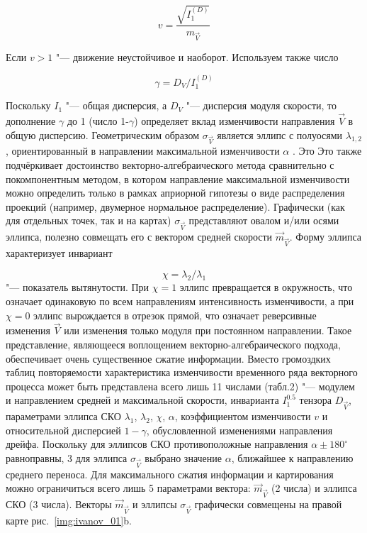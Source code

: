 \begin{equation}
\label{eq:equation3_11}
v=\frac{\sqrt{I^{(D)}_1}}{m_{\vec{V}}}
\end{equation} 

Если $v>1$ "--- движение неустойчивое и наоборот. Используем также число
		
\begin{equation}
\label{eq:equation3_12}
\gamma={D_{V}}/{I^{(D)}_1}
\end{equation} 
		
Поскольку $I_1$ "--- общая дисперсия, а $D_V$ "--- дисперсия модуля скорости, то дополнение $\gamma$ до 1 (число 1-$\gamma$) определяет вклад изменчивости направления $\vec{V}$ в общую дисперсию.
Геометрическим образом $\sigma_{\vec{V}}$ является эллипс с полуосями $\lambda_{1,2}$ , ориентированный в направлении максимальной изменчивости $\alpha$ . Это Это также подчёркивает достоинство векторно-алгебраического метода сравнительно с покомпонентным методом, в котором направление максимальной изменчивости можно определить только в рамках априорной гипотезы о виде распределения проекций (например, двумерное нормальное распределение). Графически (как для отдельных точек, так и на картах) $\sigma_{\vec{V}}$ представляют овалом и/или осями эллипса, полезно совмещать его с вектором средней скорости $\vec{m}_{\vec{V}}$. Форму эллипса характеризует инвариант
	
\begin{equation}
\label{eq:equation3_13}
\chi=\lambda_{2}/\lambda_{1}
\end{equation} "--- показатель вытянутости. При $\chi=1$ эллипс превращается в окружность, что означает одинаковую по всем направлениям интенсивность изменчивости, а при $\chi=0$ эллипс вырождается в отрезок прямой, что означает реверсивные изменения $\vec{V}$ или изменения только модуля при постоянном направлении.
Такое представление, являющееся воплощением векторно-алгебраического подхода, обеспечивает очень существенное сжатие информации. Вместо громоздких таблиц повторяемости характеристика изменчивости временного ряда векторного процесса может быть представлена всего лишь 11 числами (табл.2) "--- модулем и направлением средней и максимальной скорости, инварианта $I^{0.5}_1$ тензора $D_{\vec{V}}$, параметрами эллипса СКО $\lambda_1$, $\lambda_2$, $\chi$, $\alpha$, коэффициентом изменчивости $v$ и относительной дисперсией $1-\gamma$, обусловленной изменениями направления дрейфа. Поскольку для эллипсов СКО противоположные направления $\alpha\pm180^{\circ}$ равноправны, 3 для эллипса $\sigma_{\vec{V}}$ выбрано значение $\alpha$, ближайшее к направлению среднего переноса. Для максимального сжатия информации и картирования можно ограничиться всего лишь 5 параметрами вектора: $\vec{m}_{\vec{V}}$ (2 числа) и эллипса СКО (3 числа). Векторы $\vec{m}_{\vec{V}}$ и эллипсы $\sigma_{\vec{V}}$ графически совмещены на правой карте рис.~\ref{img:ivanov_01}b.
 
